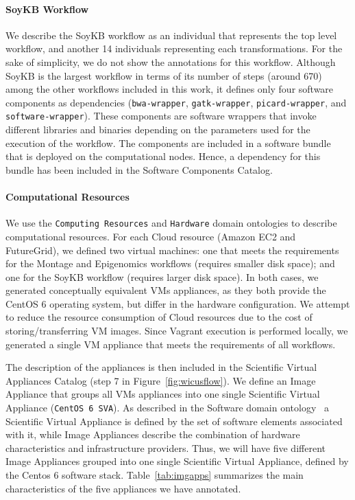 \paragraph{\textbf{SoyKB Workflow}}
We describe the SoyKB workflow as an individual that represents the top level workflow,
and another 14 individuals representing each transformations. For the sake of simplicity,
we do not show the annotations for this workflow. Although SoyKB is the largest workflow 
in terms of its number of steps (around 670) among the other workflows included in this 
work, it defines only four software components as dependencies (\texttt{bwa-wrapper}, 
\texttt{gatk-wrapper}, \texttt{picard-wrapper}, and \texttt{software-wrapper}). These 
components  are software wrappers that invoke different libraries and binaries depending 
on the parameters used for the execution of the workflow. The components are included 
in a software bundle that is deployed on the computational nodes. Hence, a 
dependency for this bundle has been included in the Software 
Components Catalog.

\paragraph{\textbf{Computational Resources}}
We use the \texttt{Computing Resources} and \texttt{Hardware} domain ontologies 
to describe computational resources. For each Cloud resource (Amazon EC2 and 
FutureGrid), we defined two virtual machines: one that meets the requirements for the 
Montage and Epigenomics workflows (requires smaller disk space); and one for the 
SoyKB workflow (requires larger disk space). In both cases, we generated conceptually 
equivalent VMs appliances, as they both provide the CentOS 6 operating system, but differ
in the hardware configuration. We attempt to reduce the resource consumption of
Cloud resources due to the cost of storing/transferring VM images. Since Vagrant
execution is performed locally, we generated a single VM appliance that meets the 
requirements of all workflows. 

The description of the appliances is then included in the Scientific Virtual Appliances 
Catalog (step 7 in Figure~\ref{fig:wicusflow}). We define  an Image Appliance that groups 
all VMs appliances into one single Scientific Virtual Appliance (\texttt{CentOS 6 SVA}). 
As described in the Software domain ontology~\cite{wicus} a Scientific Virtual Appliance
is defined by the set of software elements associated with it, while Image Appliances 
describe the combination of hardware characteristics and infrastructure providers. Thus, 
we will have five different Image Appliances grouped into one single Scientific Virtual Appliance,
defined by the Centos 6 software stack.
Table~\ref{tab:imgapps} summarizes the main characteristics of the five appliances 
we have annotated.

